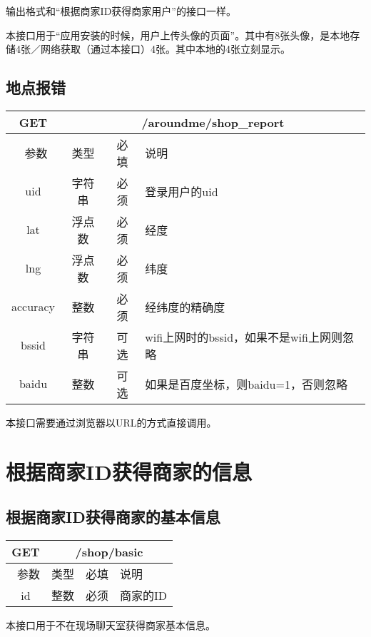 \documentclass[cs4size]{ctexartutf8}
\begin{document}
输出格式和“根据商家ID获得商家用户”的接口一样。

本接口用于“应用安装的时候，用户上传头像的页面”。其中有8张头像，是本地存储4张／网络获取（通过本接口）4张。其中本地的4张立刻显示。


\subsection{地点报错}

\begin{table}[H]
   \begin{center}
\begin{tabular}{|c|c|c|p{12cm}|}
\hline
GET & \multicolumn{3}{|c|}{/aroundme/shop\_report} \\
\hline\hline
 \  参数  & 类型 & 必填 &  说明  \\
 \hline
 uid  & 字符串 & 必须 & 登录用户的uid\\
\hline
 lat  & 浮点数 & 必须 & 经度\\
\hline
 lng  &  浮点数 & 必须 & 纬度\\ 
\hline
 accuracy  & 整数 & 必须 & 经纬度的精确度\\ 
\hline
 bssid  & 字符串 & 可选 & wifi上网时的bssid，如果不是wifi上网则忽略\\  
\hline
 baidu  & 整数 & 可选 & 如果是百度坐标，则baidu=1，否则忽略\\  
\hline
\end{tabular}
   \end{center}
\end{table}

本接口需要通过浏览器以URL的方式直接调用。



\section{根据商家ID获得商家的信息}

\subsection{根据商家ID获得商家的基本信息}

\begin{table}[H]
   \begin{center}
\begin{tabular}{|c|c|c|p{12cm}|}
\hline
GET & \multicolumn{3}{|c|}{/shop/basic} \\
\hline\hline
 \  参数  & 类型 & 必填 &  说明  \\
\hline
 id  & 整数 & 必须 & 商家的ID\\
\hline
\end{tabular}
   \end{center}
\end{table}
本接口用于不在现场聊天室获得商家基本信息。
\end{document}
